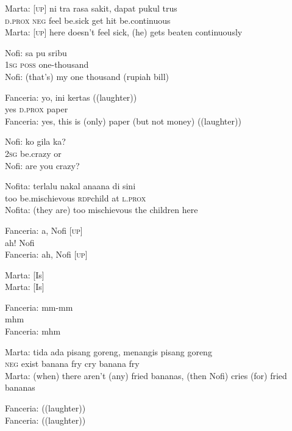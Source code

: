 \ea
\gll   Marta:   {\upshape\textsc{[up]}}   ni   tra   rasa   sakit,   dapat   pukul   trus\\
{}   {}  \textsc{d.prox}   \textsc{neg}   feel   be.sick   get   hit   be.continuous\\
\glt
Marta: [\textsc{up}] here doesn’t feel sick, (he) gets beaten continuously
\z

\ea
\gll   Nofi:   sa   pu   sribu\\
{}  \textsc{1sg}   \textsc{poss}   one-thousand\\
\glt
Nofi: (that’s) my one thousand (rupiah bill)
\z

\ea
\gll   Fanceria:   yo,   ini   kertas   ((laughter))\\
{}  yes   \textsc{d.prox}   paper   \\
\glt
Fanceria: yes, this is (only) paper (but not money) ((laughter))
\z

\ea
\gll   Nofi:   ko   gila   ka?\\
{}  \textsc{2sg}   be.crazy   or\\
\glt
Nofi: are you crazy?
\z

\ea
\gll   Nofita:   terlalu   nakal   ana{\Tilde}ana   di   sini\\
 {} too   be.mischievous   \textsc{rdp}{\Tilde}child   at   \textsc{l.prox}\\
\glt
Nofita: (they are) too mischievous the children here
\z

\ea
\gll   Fanceria:   a,   Nofi   {\upshape\textsc{[up]}}\\
{}  ah!   Nofi   \\
\glt
Fanceria: ah, Nofi [\textsc{up}]
\z

\ea
\gll   Marta:   [Is]\\
Marta: [Is]\\
\z

\ea
\gll   Fanceria:   mm-mm\\
{}  mhm\\
\glt
Fanceria: mhm
\z

\ea
\gll   Marta:   tida   ada   pisang   goreng,   menangis   pisang   goreng\\
{}  \textsc{neg}   exist   banana   fry   cry   banana   fry\\
\glt
Marta: (when) there aren’t (any) fried bananas, (then Nofi) cries (for) fried bananas
\z

\ea
\gll   Fanceria:   ((laughter))\\
Fanceria: ((laughter))\\
\z

